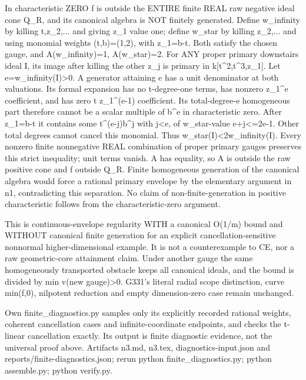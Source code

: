 In characteristic ZERO f is outside the ENTIRE finite REAL raw negative ideal cone Q\_R, and its canonical algebra is NOT finitely generated. Define w\_infinity by killing t,z\_2,... and giving z\_1 value one; define w\_star by killing z\_2,... and using monomial weights (t,b)=(1,2), with z\_1=b-t. Both satisfy the chosen gauge, and A(w\_infinity)=1, A(w\_star)=2. For ANY proper primary downstairs ideal I, its image after killing the other z\_j is primary in k[t\textasciicircum{}2,t\textasciicircum{}3,z\_1]. Let e=w\_infinity(I)\textgreater{}0. A generator attaining e has a unit denominator at both valuations. Its formal expansion has no t-degree-one terms, has nonzero z\_1\textasciicircum{}e coefficient, and has zero t z\_1\textasciicircum{}(e-1) coefficient. Its total-degree-e homogeneous part therefore cannot be a scalar multiple of b\textasciicircum{}e in characteristic zero. After z\_1=b-t it contains some t\textasciicircum{}(e-j)b\textasciicircum{}j with j\textless{}e, of w\_star-value e+j\textless{}=2e-1. Other total degrees cannot cancel this monomial. Thus w\_star(I)\textless{}2w\_infinity(I). Every nonzero finite nonnegative REAL combination of proper primary gauges preserves this strict inequality; unit terms vanish. A has equality, so A is outside the raw positive cone and f outside Q\_R. Finite homogeneous generation of the canonical algebra would force a rational primary envelope by the elementary argument in n1, contradicting this separation. No claim of non-finite-generation in positive characteristic follows from the characteristic-zero argument.

This is continuous-envelope regularity WITH a canonical O(1/m) bound and WITHOUT canonical finite generation for an explicit cancellation-sensitive nonnormal higher-dimensional example. It is not a counterexample to CE, nor a raw geometric-core attainment claim. Under another gauge the same homogeneously transported obstacle keeps all canonical ideals, and the bound is divided by min v(new gauge)\textgreater{}0. G331's literal radial scope distinction, curve min(f,0), nilpotent reduction and empty dimension-zero case remain unchanged.

Own finite\_diagnostics.py samples only its explicitly recorded rational weights, coherent cancellation cases and infinite-coordinate endpoints, and checks the t-linear cancellation exactly. Its output is finite diagnostic evidence, not the universal proof above. Artifacts n3.md, n3.tex, diagnostics-input.json and reports/finite-diagnostics.json; rerun python finite\_diagnostics.py; python assemble.py; python verify.py.

